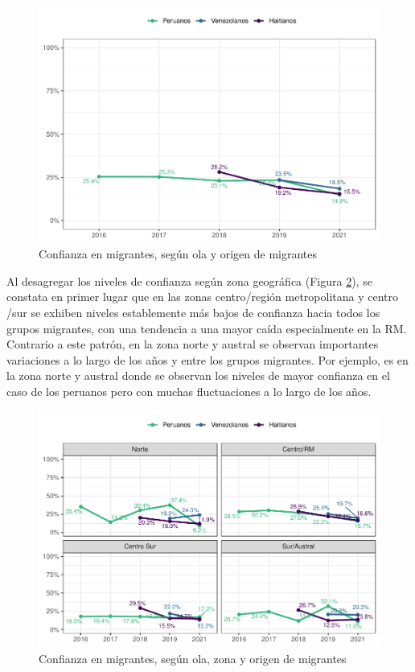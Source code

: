 \documentclass[
  12pt,
]{book}
\begin{document}
\begin{figure}

{\centering \includegraphics{reporte-elsoc_files/figure-latex/conf-wave-1} 

}

\caption{Confianza en migrantes, según ola y origen de migrantes}\label{fig:conf-wave}
\end{figure}

Al desagregar los niveles de confianza según zona geográfica (Figura \ref{fig:conf-zona}), se constata en primer lugar que en las zonas centro/región metropolitana y centro /sur se exhiben niveles establemente más bajos de confianza hacia todos los grupos migrantes, con una tendencia a una mayor caída especialmente en la RM. Contrario a este patrón, en la zona norte y austral se observan importantes variaciones a lo largo de los años y entre los grupos migrantes. Por ejemplo, es en la zona norte y austral donde se observan los niveles de mayor confianza en el caso de los peruanos pero con muchas fluctuaciones a lo largo de los años.

\begin{figure}

{\centering \includegraphics{reporte-elsoc_files/figure-latex/conf-zona-1} 

}

\caption{Confianza en migrantes, según ola, zona y origen de migrantes}\label{fig:conf-zona}
\end{figure}
\end{document}
